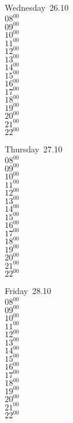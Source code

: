 \documentclass[11pt,a4paper]{book}\usepackage[]{graphicx}\usepackage[]{color}
\begin{document}
\begin{weekdaybox}
  Wednesday~26.10\\
  { 
  \vfill
  $08^{00}$\\
$09^{00}$\\
$10^{00}$\\
$11^{00}$\\
$12^{00}$\\
$13^{00}$\\
$14^{00}$\\
$15^{00}$\\
$16^{00}$\\
$17^{00}$\\
$18^{00}$\\
$19^{00}$\\
$20^{00}$\\
$21^{00}$\\
$22^{00}$\\
  }
\end{weekdaybox}
\clearpage
\begin{headerbox}
\end{headerbox}
\begin{weekdaybox}
  Thursday~27.10\\
  { 
  \vfill
  $08^{00}$\\
$09^{00}$\\
$10^{00}$\\
$11^{00}$\\
$12^{00}$\\
$13^{00}$\\
$14^{00}$\\
$15^{00}$\\
$16^{00}$\\
$17^{00}$\\
$18^{00}$\\
$19^{00}$\\
$20^{00}$\\
$21^{00}$\\
$22^{00}$\\
  }
\end{weekdaybox} 
\begin{weekdaybox}
  Friday~28.10\\
  { 
  \vfill
  $08^{00}$\\
$09^{00}$\\
$10^{00}$\\
$11^{00}$\\
$12^{00}$\\
$13^{00}$\\
$14^{00}$\\
$15^{00}$\\
$16^{00}$\\
$17^{00}$\\
$18^{00}$\\
$19^{00}$\\
$20^{00}$\\
$21^{00}$\\
$22^{00}$\\
  }
\end{weekdaybox}
\end{document}
